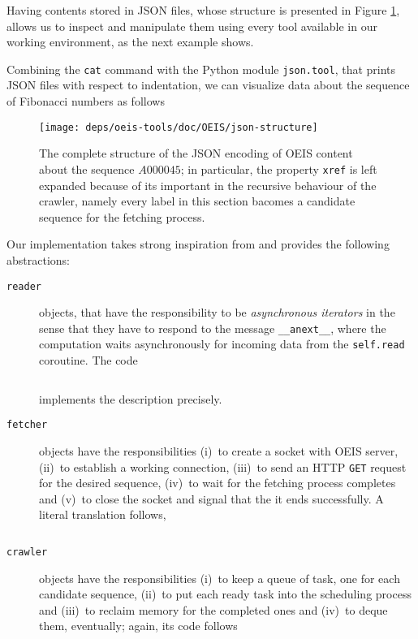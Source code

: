 Having contents stored in JSON files, whose structure is presented in Figure
\ref{fig:json-structure}, allows us to inspect and manipulate them using every
tool available in our working environment, as the next example shows.

\begin{example}
Combining the \verb|cat| command with the Python module \verb|json.tool|, that
prints JSON files with respect to indentation, we can visualize data about the
sequence of Fibonacci numbers as follows
\end{example}

\begin{figure}
\texttt{[image: deps/oeis-tools/doc/OEIS/json-structure]}
\caption{The complete structure of the JSON encoding of OEIS content about the
sequence $A000045$; in particular, the property \texttt{xref} is left expanded
because of its important in the recursive behaviour of the crawler, namely
every label in this section bacomes a candidate sequence for the fetching
process.}
\label{fig:json-structure}
\end{figure}

Our implementation takes strong inspiration from
\citep{VANROSSUM:DAVIS:async:await} and provides the following abstractions:

\begin{description}
\item[\texttt{reader}] objects, that have the responsibility to be \textit{asynchronous
iterators} in the sense that they have to respond to the message
\verb|__anext__|, where the computation waits asynchronously for incoming data
from the \verb|self.read| coroutine. The code
\inputminted[fontsize=\small,stripnl=false,firstline=28,lastline=39]
{python}{deps/oeis-tools/src/crawling.py} 
implements the description precisely.

\item[\texttt{fetcher}] objects have the responsibilities (i)~to create a socket with
OEIS server, (ii)~to establish a working connection, (iii)~to send an HTTP \verb|GET|
request for the desired sequence, (iv)~to wait for the fetching process completes
and (v)~to close the socket and signal that the it ends successfully.
A literal translation follows,
\inputminted[fontsize=\small,stripnl=false,firstline=41,lastline=86]
    {python}{deps/oeis-tools/src/crawling.py}

\item[\texttt{crawler}] objects have the responsibilities (i)~to keep a queue of task,
one for each candidate sequence, (ii)~to put each ready task into the
scheduling process and (iii)~to reclaim memory for the completed ones and
(iv)~to deque them, eventually; again, its code follows
\inputminted[fontsize=\small,stripnl=false,firstline=89,lastline=117]
    {python}{deps/oeis-tools/src/crawling.py}

\end{description}

